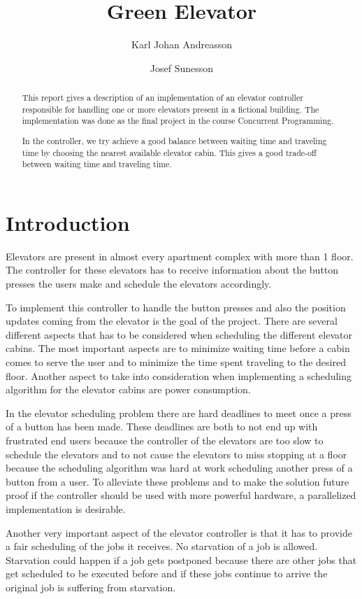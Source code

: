 \documentclass[10pt,a4paper]{article}
\author{Karl Johan Andreasson \and Josef Sunesson}
\title{Green Elevator}
\begin{document}
\maketitle

\begin{abstract}
This report gives a description of an implementation of an elevator controller responsible for handling one or more elevators present in a fictional building. The implementation was done as the final project in the course Concurrent Programming.

In the controller, we try achieve a good balance between waiting time and traveling time by choosing the nearest available elevator cabin. This gives a good trade-off between waiting time and traveling time.
\end{abstract}

\section{Introduction}
\label{sec:intro}
Elevators are present in almost every apartment complex with more than 1 floor. The controller for these elevators has to receive information about the button presses the users make and schedule the elevators accordingly.

To implement this controller to handle the button presses and also the position updates coming from the elevator is the goal of the project. There are several different aspects that has to be considered when scheduling the different elevator cabins. The most important aspects are to minimize waiting time before a cabin comes to serve the user and to minimize the time spent traveling to the desired floor. Another aspect to take into consideration when implementing a scheduling algorithm for the elevator cabins are power consumption.

In the elevator scheduling problem there are hard deadlines to meet once a press of a button has been made. These deadlines are both to not end up with frustrated end users because the controller of the elevators are too slow to schedule the elevators and to not cause the elevators to miss stopping at a floor because the scheduling algorithm was hard at work scheduling another press of a button from a user. To alleviate these problems and to make the solution future proof if the controller should be used with more powerful hardware, a parallelized implementation is desirable.

Another very important aspect of the elevator controller is that it has to provide a fair scheduling of the jobs it receives. No starvation of a job is allowed. Starvation could happen if a job gets postponed because there are other jobs that get scheduled to be executed before and if these jobs continue to arrive the original job is suffering from starvation.
\end{document}
